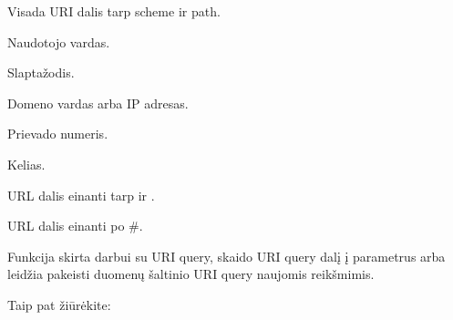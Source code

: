 \documentclass[letterpaper,10pt,lithuanian]{sphinxmanual}
\begin{document}
\begin{fulllineitems}
\begin{fulllineitems}
\begin{description}
\sphinxAtStartPar
Visada URI dalis tarp scheme ir path.

\sphinxAtStartPar
Naudotojo vardas.

\sphinxAtStartPar
Slaptažodis.

\sphinxAtStartPar
Domeno vardas arba IP adresas.

\sphinxAtStartPar
Prievado numeris.

\sphinxAtStartPar
Kelias.

\sphinxAtStartPar
URL dalis einanti tarp  ir \sphinxcode{\sphinxupquote{\#}}.

\sphinxAtStartPar
URL dalis einanti po \#.

\end{description}

\end{fulllineitems}


\begin{fulllineitems}
\label{\detokenize{formules:query}}
\pysigstartsignatures
\pysiglinewithargsret
{}
{}
{}
\pysigstopsignatures
\sphinxAtStartPar
Funkcija skirta darbui su URI query, skaido URI query dalį į parametrus
arba leidžia pakeisti duomenų šaltinio URI query naujomis reikšmimis.


\begin{sphinxseealso}{Taip pat žiūrėkite:}

\begin{DUlineblock}{0em}
\item[] {\hyperref[\detokenize{dimensijos:param.query}]{}}
\end{DUlineblock}


\end{sphinxseealso}


\end{fulllineitems}



\end{fulllineitems}
\end{document}
